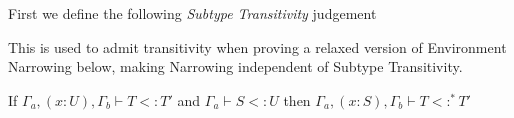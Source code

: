 \documentclass{llncs}
\begin{document}
First we define the following \emph{Subtype Transitivity} judgement 
This is used to admit transitivity when proving a relaxed version of
Environment Narrowing below, making Narrowing independent of 
Subtype Transitivity.
\begin{theorem}
If $\Gamma_a, (x : U), \Gamma_b \vdash T <: T'$ and 
   	$\Gamma_a \vdash S <: U$ then
	$\Gamma_a, (x : S), \Gamma_b \vdash T <:^* T'$
\end{theorem}
\end{document}

